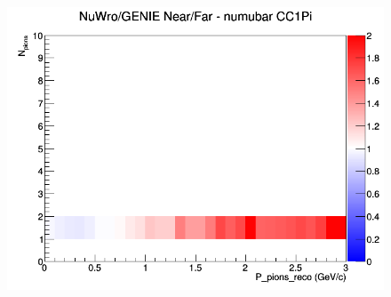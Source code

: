 \documentclass[12pt]{article}
\begin{document}
\begin{figure}[h]
\endminipage
{}
\includegraphics[width=\linewidth]{eff_N_P/LAr/pions/ratios/CC1Pi_NuWro_GENIE_numubar_NF_N_P.png}
\endminipage
\newline
\end{figure}
\clearpage
\end{document}
